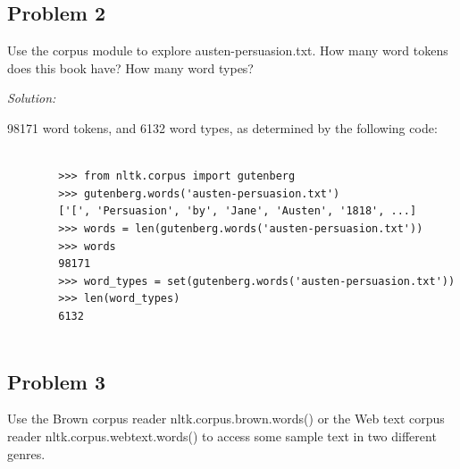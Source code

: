 \documentclass[11pt]{article}
\newenvironment{solution}{
	\vspace{10px}\noindent\emph{Solution:}
}{
	\vspace{10px}
}
\begin{document}
\subsection*{Problem 2}
Use the corpus module to explore austen-persuasion.txt. How many word tokens does this book have? How many word types?

\begin{solution}
	
	98171 word tokens, and 6132 word types, as determined by the following code:
	
	\begin{lstlisting}
	
		>>> from nltk.corpus import gutenberg
		>>> gutenberg.words('austen-persuasion.txt')
		['[', 'Persuasion', 'by', 'Jane', 'Austen', '1818', ...]
		>>> words = len(gutenberg.words('austen-persuasion.txt'))
		>>> words
		98171
		>>> word_types = set(gutenberg.words('austen-persuasion.txt'))
		>>> len(word_types)
		6132
	
	\end{lstlisting}
	
\end{solution}  


\subsection*{Problem 3}
Use the Brown corpus reader nltk.corpus.brown.words() or the Web text corpus reader nltk.corpus.webtext.words() to access some sample text in two different genres.
\end{document}
